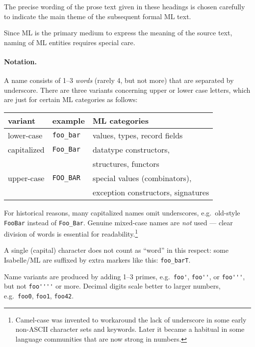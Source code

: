 \begin{isabellebody}
\begin{isamarkuptext}
  \medskip The precise wording of the prose text given in these
  headings is chosen carefully to indicate the main theme of the
  subsequent formal ML text.%
\end{isamarkuptext}%
\isamarkuptrue%
%
\isamarkuptrue%
%
\begin{isamarkuptext}%
Since ML is the primary medium to express the meaning of the
  source text, naming of ML entities requires special care.

  \paragraph{Notation.}  A name consists of 1--3 \emph{words} (rarely
  4, but not more) that are separated by underscore.  There are three
  variants concerning upper or lower case letters, which are just for
  certain ML categories as follows:

  \medskip
  \begin{tabular}{lll}
  variant & example & ML categories \\\hline
  lower-case & \verb|foo_bar| & values, types, record fields \\
  capitalized & \verb|Foo_Bar| & datatype constructors, \\
    & & structures, functors \\
  upper-case & \verb|FOO_BAR| & special values (combinators), \\
    & & exception constructors, signatures \\
  \end{tabular}
  \medskip

  For historical reasons, many capitalized names omit underscores,
  e.g.\ old-style \verb|FooBar| instead of \verb|Foo_Bar|.
  Genuine mixed-case names are \emph{not} used --- clear division of
  words is essential for readability.\footnote{Camel-case was invented
  to workaround the lack of underscore in some early non-ASCII
  character sets and keywords.  Later it became a habitual in some
  language communities that are now strong in numbers.}

  A single (capital) character does not count as ``word'' in this
  respect: some Isabelle/ML are suffixed by extra markers like this:
  \verb|foo_barT|.

  Name variants are produced by adding 1--3 primes, e.g.\ \verb|foo'|, \verb|foo''|, or \verb|foo'''|, but not \verb|foo''''| or more.  Decimal digits scale better to larger numbers,
  e.g.\ \verb|foo0|, \verb|foo1|, \verb|foo42|.


\end{isamarkuptext}
\end{isabellebody}
